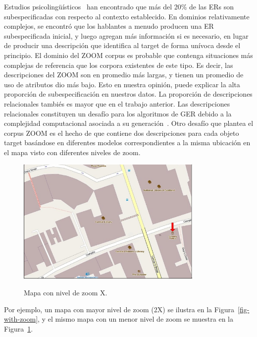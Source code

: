 Estudios psicoling\"u\'{i}sticos~\cite{Clark1986} han encontrado que m\'as del 20\% de las ERs son subespecificadas con respecto al contexto establecido. En dominios relativamente complejos, se encontr\'o que los hablantes a menudo producen una ER subespecificada inicial, y luego agregan m\'as informaci\'on si es necesario, en lugar de producir una descripci\'on que identifica al target de forma un\'{i}voca desde el principio. El dominio del ZOOM corpus es probable que contenga situaciones m\'as complejas de referencia que los corpora existentes de este tipo. Es decir, las descripciones del ZOOM son en promedio m\'as largas, y tienen un promedio de uso de atributos dio m\'as bajo. Esto en nuestra opini\'on, puede explicar la alta proporci\'on de subespecificaci\'on en nuestros datos. La proporci\'on de descripciones relacionales tambi\'es es mayor que en el trabajo anterior. Las descripciones relacionales constituyen un desaf\'{i}o para los algoritmos de GER debido a la complejidad computacional asociada a su generaci\'on~\cite{survey}. Otro desaf\'{i}o que plantea el corpus ZOOM es el hecho de que contiene dos descripciones para cada objeto target bas\'andose en diferentes modelos correspondientes a la misma ubicaci\'on en el mapa visto con diferentes niveles de zoom. 
\begin{figure}[ht]
\begin{center}
\includegraphics[width=9cm]{images/interface2-b.png}\\[0pt]
\caption{Mapa con nivel de zoom X.}
\label{interface2}
\end{center}
\end{figure}
Por ejemplo, un mapa con mayor nivel de zoom (2X) se ilustra en la Figura~\ref{fig-with-zoom}, y el mismo mapa con un menor nivel de zoom se muestra en la Figura~\ref{interface2}.

